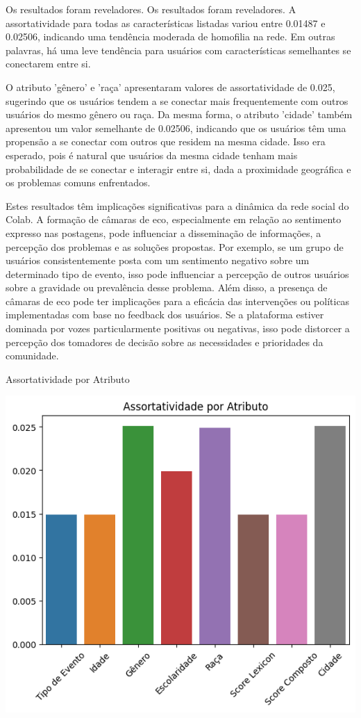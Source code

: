 Os resultados foram reveladores. Os resultados foram reveladores. A assortatividade para todas as características listadas variou entre 0.01487 e 0.02506, indicando uma tendência moderada de homofilia na rede. Em outras palavras, há uma leve tendência para usuários com características semelhantes se conectarem entre si.

O atributo 'gênero' e 'raça' apresentaram valores de assortatividade de 0.025, sugerindo que os usuários tendem a se conectar mais frequentemente com outros usuários do mesmo gênero ou raça. Da mesma forma, o atributo 'cidade' também apresentou um valor semelhante de 0.02506, indicando que os usuários têm uma propensão a se conectar com outros que residem na mesma cidade. Isso era esperado, pois é natural que usuários da mesma cidade tenham mais probabilidade de se conectar e interagir entre si, dada a proximidade geográfica e os problemas comuns enfrentados.

Estes resultados têm implicações significativas para a dinâmica da rede social do Colab. A formação de câmaras de eco, especialmente em relação ao sentimento expresso nas postagens, pode influenciar a disseminação de informações, a percepção dos problemas e as soluções propostas. Por exemplo, se um grupo de usuários consistentemente posta com um sentimento negativo sobre um determinado tipo de evento, isso pode influenciar a percepção de outros usuários sobre a gravidade ou prevalência desse problema. Além disso, a presença de câmaras de eco pode ter implicações para a eficácia das intervenções ou políticas implementadas com base no feedback dos usuários. Se a plataforma estiver dominada por vozes particularmente positivas ou negativas, isso pode distorcer a percepção dos tomadores de decisão sobre as necessidades e prioridades da comunidade.

\begin{quadro}[!htb]
	\caption{Assortatividade por Atributo}
	\label{fig:assortativity_by_attribute}
	\centering
	\includegraphics[scale=0.75]{images/assortativity_by_attribute.png}
	\fautor
\end{quadro}


